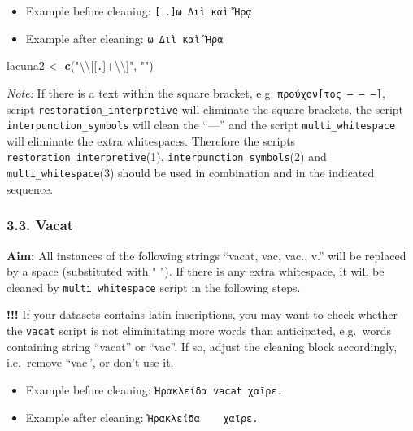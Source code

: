 \documentclass[]{article}
\newenvironment{Shaded}{\begin{snugshade}}{\end{snugshade}}
\newcommand{\CharTok}[1]{\textcolor[rgb]{0.31,0.60,0.02}{#1}}
\newcommand{\KeywordTok}[1]{\textcolor[rgb]{0.13,0.29,0.53}{\textbf{#1}}}
\newcommand{\NormalTok}[1]{#1}
\newcommand{\StringTok}[1]{\textcolor[rgb]{0.31,0.60,0.02}{#1}}
\providecommand{\tightlist}{%
  \setlength{\itemsep}{0pt}\setlength{\parskip}{0pt}}
\begin{document}
\begin{itemize}
\tightlist
\item
  Example before cleaning: \texttt{{[}․․{]}ω\ Διὶ\ καὶ\ Ἥρᾳ}
\item
  Example after cleaning: \texttt{ω\ Διὶ\ καὶ\ Ἥρᾳ}
\end{itemize}

\begin{Shaded}
\begin{Highlighting}[]
\NormalTok{lacuna2 <-}\StringTok{ }\KeywordTok{c}\NormalTok{(}\StringTok{"}\CharTok{\textbackslash{}\textbackslash{}}\StringTok{[[․]+}\CharTok{\textbackslash{}\textbackslash{}}\StringTok{]"}\NormalTok{, }\StringTok{""}\NormalTok{)}
\end{Highlighting}
\end{Shaded}

\emph{Note:} If there is a text within the square bracket, e.g.
\texttt{προύχον{[}τος\ —\ —\ —{]}}, script
\texttt{restoration\_interpretive} will eliminate the square brackets,
the script \texttt{interpunction\_symbols} will clean the ``---'' and
the script \texttt{multi\_whitespace} will eliminate the extra
whitespaces. Therefore the scripts
\texttt{restoration\_interpretive}(1),
\texttt{interpunction\_symbols}(2) and \texttt{multi\_whitespace}(3)
should be used in combination and in the indicated sequence.

\hypertarget{vacat}{%
\subsubsection{3.3. Vacat}\label{vacat}}

\textbf{Aim:} All instances of the following strings ``vacat, vac, vac.,
v.'' will be replaced by a space (substituted with " "). If there is any
extra whitespace, it will be cleaned by \texttt{multi\_whitespace}
script in the following steps.

\textbf{!!!} If your datasets contains latin inscriptions, you may want
to check whether the \texttt{vacat} script is not eliminitating more
words than anticipated, e.g.~words containing string ``vacat'' or
``vac''. If so, adjust the cleaning block accordingly, i.e.~remove
``vac'', or don't use it.

\begin{itemize}
\tightlist
\item
  Example before cleaning: \texttt{Ἡρακλείδα\ vacat\ χαῖρε.}
\item
  Example after cleaning: \texttt{Ἡρακλείδα\ \ \ \ χαῖρε.}
\end{itemize}
\end{document}

